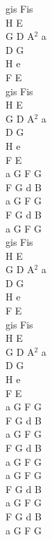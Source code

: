 \documentclass[a5paper, 10pt]{book}
\begin{document}
\begin{minipage}[t]{0.2\textwidth}
  gis Fis\\
  H E\\
  G D A$^2$ a\\
  D G\\
  H e\\
  F E\vspace*{2mm}\\
  gis Fis\\
  H E\\
  G D A$^2$ a\\
  D G\\
  H e\\
  F E\vspace*{2mm}\\
  a G F G\\
  F G d B\\
  a G F G\\
  F G d B\\
  a G F G\vspace*{2mm}\\
  gis Fis\\
  H E\\
  G D A$^2$ a\\
  D G\\
  H e\\
  F E\vspace*{2mm}\\
  gis Fis\\
  H E\\
  G D A$^2$ a\\
  D G\\
  H e\\
  F E\vspace*{2mm}\\
  a G F G\\
  F G d B\\
  a G F G\\
  F G d B\\
  a G F G\vspace*{2mm}\\
  a G F G\\
  F G d B\\
  a G F G\\
  F G d B\\
  a G F G\\

\end{minipage}

\newpage
\end{document}
